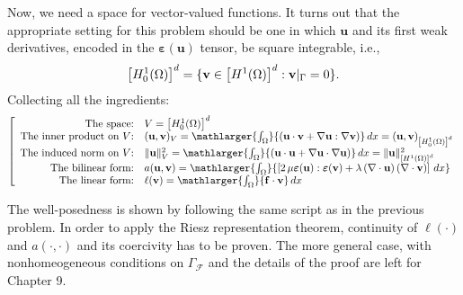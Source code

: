 Now, we need a space for vector-valued functions. It turns out that
the appropriate setting for this problem should be one
in which $\mathbf{u}$ and its first weak derivatives, encoded
in the $\boldsymbol{\varepsilon}(\mathbf{u})$ tensor, be square integrable, i.e.,
\begin{equation}
\left [H^1_0(\Omega) \right]^d = \{\mathbf{v} \in \left [H^1(\Omega)\right]^d : \mathbf{v}|_{\Gamma} = 0 \}. \labeq{H1vec}
\end{equation}
Collecting all the ingredients:
\begin{equation}
\left[
\begin{array}{rl}
  \mbox{The space:} & V = \left[H_0^1(\Omega)\right]^d   \nonumber \\
  \mbox{The inner product on $V$:} & (\mathbf{u},\mathbf{v})_V = \mathlarger{\int_{\Omega}}{\left ( \mathbf{u} \cdot \mathbf{v} +
  \nabla{\mathbf{u}} : \nabla{\mathbf{v}}\right)}\,dx = (\mathbf{u},\mathbf{v})_{\left[H_0^1(\Omega)\right]^d} \nonumber \\
  \mbox{The induced norm on $V$:} & \lVert \mathbf{u} \rVert^2_V = \mathlarger{\int_{\Omega}}{\left ( \mathbf{u} \cdot \mathbf{u}  + \nabla{\mathbf{u}} \cdot \nabla{\mathbf{u}}\right)}\,dx
  = \lVert \mathbf{u} \rVert^2_{\left[H^1(\Omega)\right]^d} \nonumber \\
  \mbox{The bilinear form:} & a(\mathbf{u},\mathbf{v}) =\mathlarger{\int_{\Omega}}{\left [2\,\mu \boldsymbol{\varepsilon}(\mathbf{u}) : \boldsymbol{\varepsilon}(\mathbf{v})
+ \lambda\,(\nabla \cdot \mathbf{u})\,(\nabla \cdot \mathbf{v})\right ]\,dx} \nonumber \\
  \mbox{The linear form:} & \ell(\mathbf{v}) = \mathlarger{\int_{\Omega}}{\mathbf{f} \cdot \mathbf{v}} \,dx \nonumber
\end{array}
\right.
\end{equation}


The well-posedness is shown by following the same script as in the previous problem.
In order to apply the Riesz representation theorem, continuity of $\ell(\cdot)$ and $a(\cdot,\cdot)$
and its coercivity has to be proven. The more general case, with nonhomeogeneous conditions on
$\Gamma_{\boldsymbol{\mathcal{F}}}$ and the details of the proof are left for Chapter 9.

